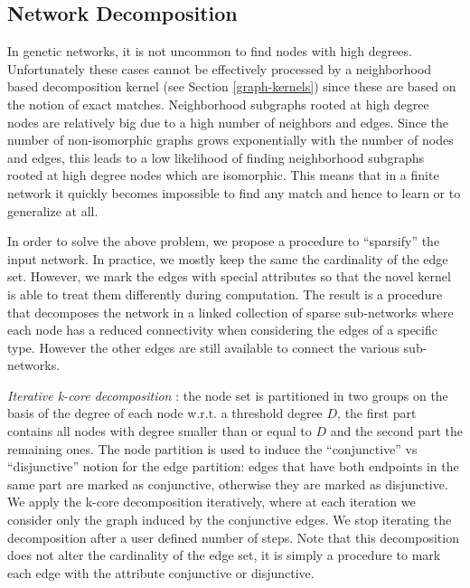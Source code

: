 \documentclass[review]{elsarticle}
\begin{document}
\subsection{Network Decomposition} 
\label{network-decomposition}
In genetic networks, it is not uncommon to find nodes with high degrees. Unfortunately these cases cannot be effectively processed by a neighborhood based decomposition kernel (see Section \ref{graph-kernels}) since these are based on the notion of exact matches. Neighborhood subgraphs rooted at high degree nodes are relatively big due to a high number of neighbors and edges. Since the number of non-isomorphic graphs grows exponentially with the number of nodes and edges, this leads to a low likelihood of finding neighborhood subgraphs rooted at high degree nodes which are isomorphic. 
This means that in a finite network it quickly becomes impossible to find any match and hence to learn or to generalize at all. 

In order to solve the above problem, we propose a procedure to ``sparsify'' the input network. In practice, we mostly keep the same the cardinality of the edge set. However, we mark the edges with special attributes so that the novel kernel is able to treat them differently during computation. The result is a procedure that decomposes the network in a linked collection of sparse sub-networks where each node has a reduced connectivity when considering the edges of a specific type. However the other edges are still available to connect the various sub-networks. 

\textit{Iterative k-core decomposition} \cite{alvarez2005k}: the node set is partitioned in two groups on the basis of the degree of each node w.r.t. a threshold degree $D$, the first part contains all nodes with degree smaller than or equal to $D$ and the second part the remaining ones. The node partition is used to induce the ``conjunctive'' vs ``disjunctive'' notion for the edge partition: edges that have both endpoints in the same part are marked as conjunctive, otherwise they are marked as disjunctive. We apply the k-core decomposition iteratively, where at each iteration we consider only the graph induced by the conjunctive edges. We stop iterating the decomposition after a user defined number of steps. Note that this decomposition does not alter the cardinality of the edge set, it is simply a procedure to mark each edge with the attribute conjunctive or disjunctive.  
\end{document}
